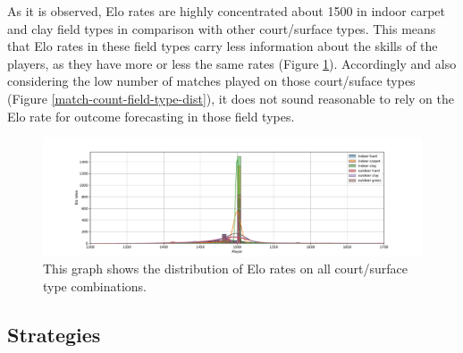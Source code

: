 \documentclass[preprint,aps,nofootinbib,a4paper,superscriptaddress,longbibliography,amsfonts,amssymb,amsmath,titlepage]{revtex4-2}
\begin{document}
As it is observed, Elo rates are highly concentrated about 1500 in indoor carpet and clay field types in comparison with other court/surface types. This means that Elo rates in these field types carry less information about the skills of the players, as they have more or less the same rates (Figure \ref{elo-rate-field-type-dist}). Accordingly and also considering the low number of matches played on those court/suface types (Figure \ref{match-count-field-type-dist}), it does not sound reasonable to rely on the Elo rate for outcome forecasting in those field types.
%
\begin{figure}[h]
\includegraphics[width=\textwidth]{pictures/elo-rate-field-type-dist.pdf}
\caption{This graph shows the distribution of Elo rates on all court/surface type combinations.}
\label{elo-rate-field-type-dist}
\end{figure}
%


\subsection{Strategies}
\end{document}
